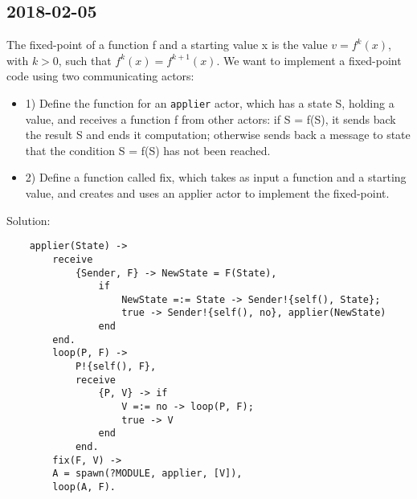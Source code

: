 \subsection{2018-02-05}
The fixed-point of a function f and a starting value x is the value $v = f^{k}(x)$, with $k > 0$, such that $f^{k}(x) = f^{k+1}(x)$. We want to implement a fixed-point code using two communicating actors:
\begin{itemize}
    \item 1) Define the function for an \texttt{applier} actor, which has a state S, holding a value, and receives a function f from other actors: if S = f(S), it sends back the result S and ends it computation; otherwise sends back a message to state that the condition S = f(S) has not been reached.
    \item 2) Define a function called fix, which takes as input a function and a starting value, and creates and uses an applier actor to implement the fixed-point.
\end{itemize}
Solution:
\begin{lstlisting}
    applier(State) ->
        receive
            {Sender, F} -> NewState = F(State),
                if
                    NewState =:= State -> Sender!{self(), State};
                    true -> Sender!{self(), no}, applier(NewState)
                end
        end.
        loop(P, F) ->
            P!{self(), F},
            receive
                {P, V} -> if
                    V =:= no -> loop(P, F);
                    true -> V
                end
            end.
        fix(F, V) ->
        A = spawn(?MODULE, applier, [V]),
        loop(A, F).
\end{lstlisting}